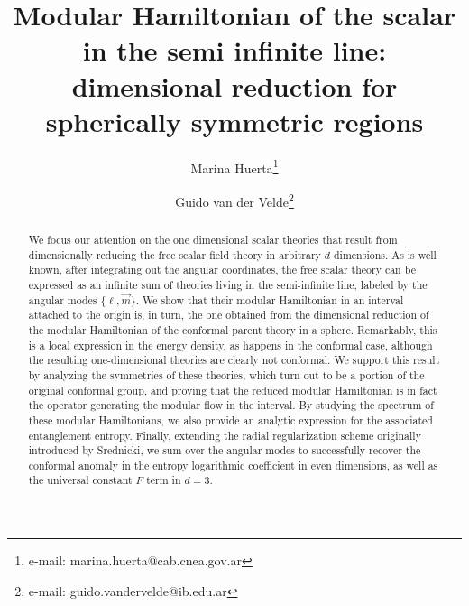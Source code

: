 \documentclass[12pt,a4paper]{article}
\begin{document}
\title{Modular Hamiltonian of the scalar in the semi infinite line: dimensional reduction for spherically symmetric regions}


\author{Marina Huerta\footnote{e-mail: marina.huerta@cab.cnea.gov.ar} }

\author{Guido van der Velde\footnote{e-mail: guido.vandervelde@ib.edu.ar }}


\date{}

\maketitle
\begin{abstract}
We focus our attention on the one dimensional scalar theories that result from dimensionally reducing the free scalar field theory in arbitrary $d$ dimensions. As is well known, after integrating out the angular coordinates, the free scalar theory can be expressed as an infinite sum of theories living in the semi-infinite line, labeled by the angular modes $\{\ell,\vec{m}\}$. 
 We show that their modular Hamiltonian in an interval attached to the origin is, in turn, the one obtained from the dimensional reduction of the modular Hamiltonian of the conformal parent theory in a sphere. Remarkably, this is a local expression in the energy density, as happens in the conformal case, although the resulting one-dimensional theories are clearly not conformal. We support this result by analyzing the symmetries of these theories, which turn out to be a portion of the original conformal group, and proving that the reduced modular Hamiltonian is in fact the operator generating the modular flow in the interval. By studying the spectrum of these modular Hamiltonians, we also provide an analytic expression for the associated entanglement entropy. Finally, extending the radial regularization scheme originally introduced by Srednicki, we sum over the angular modes to successfully recover the conformal anomaly in the entropy logarithmic coefficient in even dimensions, as well as the universal constant $F$ term in $d=3$.






\end{abstract}
\end{document}

